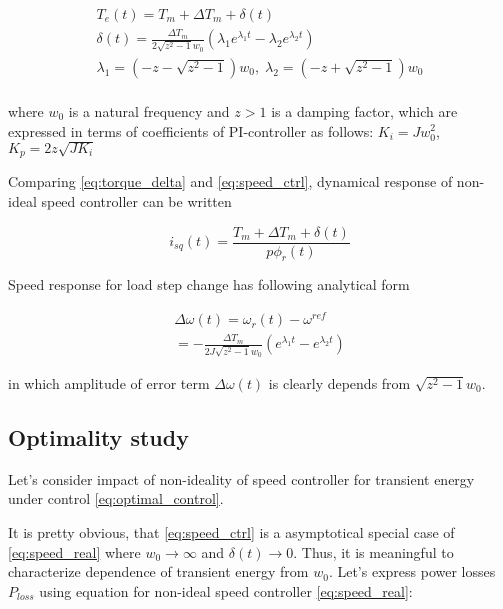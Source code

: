 \documentclass[journal]{IEEEtran}
\begin{document}
\begin{equation}\label{eq:torque_delta}
\begin{gathered}
T_e(t) = T_m + \Delta T_m + \delta(t) \\
\delta(t) = \frac{\Delta T_m}{2 \sqrt{z^2 - 1} w_0}\left ( \lambda_1 e^{\lambda_1 t} - \lambda_2 e^{\lambda_2 t} \right ) \\
\lambda_1 = (-z - \sqrt{z^2 - 1}) w_0, \; \lambda_2 = (-z + \sqrt{z^2 - 1}) w_0 \\
\end{gathered}
\end{equation}

where $w_0$ is a natural frequency and $z > 1$ is a damping factor, which are expressed in terms of coefficients of PI-controller as follows: 
$K_i = J w_0^2$, $K_p = 2 z \sqrt{J K_i}$

Comparing \eqref{eq:torque_delta} and \eqref{eq:speed_ctrl}, dynamical response of non-ideal speed controller can be written

\begin{equation}\label{eq:speed_real}
 i_{sq}(t) = \frac{T_m+\Delta T_m + \delta(t)}{p \phi_r(t)} 
\end{equation}

Speed response for load step change has following analytical form

\begin{equation}\label{eq:speed_delta}
\begin{gathered}
\Delta \omega(t) = \omega_r(t) - \omega^{ref} \\
= -\frac{\Delta T_m}{2 J \sqrt{z^2 - 1} w_0}\left ( e^{\lambda_1 t} - e^{\lambda_2 t} \right )
\end{gathered}
\end{equation}

in which amplitude of error term $\Delta \omega(t)$ is clearly depends from $\sqrt{z^2 - 1} w_0$.

\subsection{Optimality study}

Let's consider impact of non-ideality of speed controller for transient energy under control \eqref{eq:optimal_control}. 

It is pretty obvious, that \eqref{eq:speed_ctrl} is a asymptotical special case of \eqref{eq:speed_real} where $w_0 \to \infty$ and $\delta(t) \to 0$. Thus, it is meaningful to characterize dependence of transient energy from $w_0$. Let's express power losses $P_{loss}$ using equation for non-ideal speed controller \eqref{eq:speed_real}:
\end{document}
